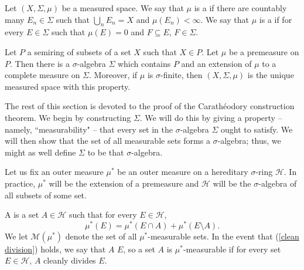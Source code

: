 \begin{definition}
Let $(X, \Sigma, \mu)$ be a measured space.
We say that $\mu$ is a  if there are countably many $E_n \in \Sigma$ such that $\bigcup_n E_n = X$ and $\mu(E_n) < \infty$.
We say that $\mu$ is a  if for every $E \in \Sigma$ such that $\mu(E) = 0$ and $F \subseteq E$, $F \in \Sigma$.
\end{definition}

\begin{theorem}
Let $P$ a semiring of subsets of a set $X$ such that $X \in P$.
Let $\mu$ be a premeasure on $P$.
Then there is a $\sigma$-algebra $\Sigma$ which contains $P$ and an extension of $\mu$ to a complete measure on $\Sigma$.
Moreover, if $\mu$ is $\sigma$-finite, then $(X, \Sigma, \mu)$ is the unique measured space with this property.
\end{theorem}

\begin{subsec}
The rest of this section is devoted to the proof of the Carathéodory construction theorem.
We begin by constructing $\Sigma$.
We will do this by giving a property -- namely, ``measurability" -- that every set in the $\sigma$-algebra $\Sigma$ ought to satisfy.
We will then show that the set of all measurable sets forms a $\sigma$-algebra; thus, we might as well define $\Sigma$ to be that $\sigma$-algebra.
\end{subsec}

\begin{subsec}
Let us fix an outer measure $\mu^*$ be an outer measure on a hereditary $\sigma$-ring $\mathcal H$.
In practice, $\mu^*$ will be the extension of a premeasure and $\mathcal H$ will be the $\sigma$-algebra of all subsets of some set.
\end{subsec}

\begin{definition}
A  is a set $A \in \mathcal H$ such that for every $E \in \mathcal H$,
\begin{equation}
\label{clean division}
\mu^*(E) = \mu^*(E \cap A) + \mu^*(E \setminus A).
\end{equation}
We let $\mathcal M(\mu^*)$ denote the set of all $\mu^*$-measurable sets.
In the event that (\ref{clean division}) holds, we say that $A$  $E$, so a set $A$ is $\mu^*$-measurable if for every set $E \in \mathcal H$, $A$ cleanly divides $E$.
\end{definition}


